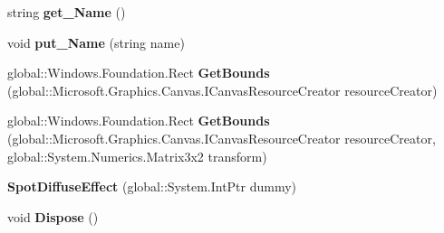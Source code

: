 \begin{DoxyCompactItemize}
\item 
\mbox{\label{class_microsoft_1_1_graphics_1_1_canvas_1_1_effects_1_1_spot_diffuse_effect_a80017a8bc269e8b53be0237475f42fef}} 
string {\bfseries get\+\_\+\+Name} ()
\item 
\mbox{\label{class_microsoft_1_1_graphics_1_1_canvas_1_1_effects_1_1_spot_diffuse_effect_a84ad78cbbefa7d06bccedf8db81a069b}} 
void {\bfseries put\+\_\+\+Name} (string name)
\item 
\mbox{\label{class_microsoft_1_1_graphics_1_1_canvas_1_1_effects_1_1_spot_diffuse_effect_a69c0c17aa611778dd2e2b32293e37614}} 
global\+::\+Windows.\+Foundation.\+Rect {\bfseries Get\+Bounds} (global\+::\+Microsoft.\+Graphics.\+Canvas.\+I\+Canvas\+Resource\+Creator resource\+Creator)
\item 
\mbox{\label{class_microsoft_1_1_graphics_1_1_canvas_1_1_effects_1_1_spot_diffuse_effect_ac221cecc5ef487645395a4d4e165ea3d}} 
global\+::\+Windows.\+Foundation.\+Rect {\bfseries Get\+Bounds} (global\+::\+Microsoft.\+Graphics.\+Canvas.\+I\+Canvas\+Resource\+Creator resource\+Creator, global\+::\+System.\+Numerics.\+Matrix3x2 transform)
\item 
\mbox{\label{class_microsoft_1_1_graphics_1_1_canvas_1_1_effects_1_1_spot_diffuse_effect_a1793ac01d2b7fcfb4c8585ffa6e4fe3e}} 
{\bfseries Spot\+Diffuse\+Effect} (global\+::\+System.\+Int\+Ptr dummy)
\item 
\mbox{\label{class_microsoft_1_1_graphics_1_1_canvas_1_1_effects_1_1_spot_diffuse_effect_aafe044ef81617030138a79156a50e0df}} 
void {\bfseries Dispose} ()
\item 
\mbox{\label{class_microsoft_1_1_graphics_1_1_canvas_1_1_effects_1_1_spot_diffuse_effect_a8633fde2eefa69e9fe028b4a634a7b91}} 

\end{DoxyCompactItemize}
